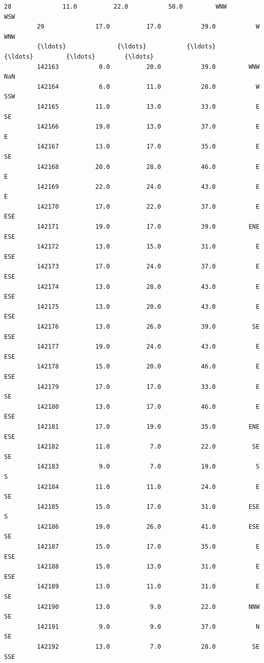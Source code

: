 \documentclass[11pt]{article}
\begin{document}
\begin{Verbatim}[commandchars=\\\{\}]
         28              11.0          22.0           50.0         WNW        WSW   
         29              17.0          17.0           39.0           W        WNW   
         {\ldots}              {\ldots}           {\ldots}            {\ldots}         {\ldots}        {\ldots}   
         142163           0.0          20.0           39.0         WNW        NaN   
         142164           6.0          11.0           28.0           W        SSW   
         142165          11.0          13.0           33.0           E         SE   
         142166          19.0          13.0           37.0           E          E   
         142167          13.0          17.0           35.0           E         SE   
         142168          20.0          28.0           46.0           E          E   
         142169          22.0          24.0           43.0           E          E   
         142170          17.0          22.0           37.0           E        ESE   
         142171          19.0          17.0           39.0         ENE        ESE   
         142172          13.0          15.0           31.0           E        ESE   
         142173          17.0          24.0           37.0           E        ESE   
         142174          13.0          28.0           43.0           E        ESE   
         142175          13.0          20.0           43.0           E        ESE   
         142176          13.0          26.0           39.0          SE        ESE   
         142177          19.0          24.0           43.0           E        ESE   
         142178          15.0          20.0           46.0           E        ESE   
         142179          17.0          17.0           33.0           E         SE   
         142180          13.0          17.0           46.0           E        ESE   
         142181          17.0          19.0           35.0         ENE        ESE   
         142182          11.0           7.0           22.0          SE         SE   
         142183           9.0           7.0           19.0           S          S   
         142184          11.0          11.0           24.0           E         SE   
         142185          15.0          17.0           31.0         ESE          S   
         142186          19.0          26.0           41.0         ESE         SE   
         142187          15.0          17.0           35.0           E        ESE   
         142188          15.0          13.0           31.0           E        ESE   
         142189          13.0          11.0           31.0           E         SE   
         142190          13.0           9.0           22.0         NNW         SE   
         142191           9.0           9.0           37.0           N         SE   
         142192          13.0           7.0           28.0          SE        SSE   
         

\end{Verbatim}
\end{document}
